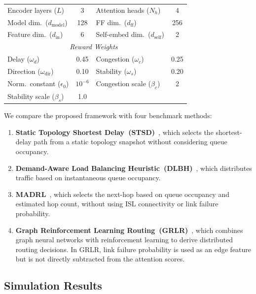 \begin{table}[t]
{\begin{tabular}{lc|lc}
\midrule
Encoder layers ($L$)                  & 3         & Attention heads ($N_h$)             & 4              \\
Model dim.\ ($d_{\mathrm{model}}$)   & 128       & FF dim.\ ($d_{\mathrm{ff}}$)       & 256            \\
Feature dim.\ ($d_{\mathrm{in}}$)    & 6         & Self-embed dim.\ ($d_{\mathrm{self}}$) & 2           \\
\midrule
\multicolumn{4}{c}{\textit{Reward Weights~\cite{chen2025distributed}}} \\
\midrule
Delay ($\omega_d$) & 0.45 & Congestion ($\omega_c$) & 0.25 \\
Direction ($\omega_{\mathrm{dir}}$) & 0.10 & Stability ($\omega_s$) & 0.20 \\
Norm.\ constant ($\epsilon_0$) & $10^{-6}$ & Congestion scale ($\beta_c$) & 2 \\
Stability scale ($\beta_s$) & 1.0 & & \\
\bottomrule
\end{tabular}%
}
\end{table}

We compare the proposed framework with four benchmark methods:
\begin{enumerate}
\item \textbf{Static Topology Shortest Delay~(STSD)}~\cite{zhang2020routing}, which selects the shortest-delay path from a static topology snapshot without considering queue occupancy.
\item \textbf{Demand-Aware Load Balancing Heuristic~(DLBH)}~\cite{bhattacharjee2024demand}, which distributes traffic based on instantaneous queue occupancy.
\item \textbf{MADRL}~\cite{liu2024enabling, lozano2025continual}, which selects the next-hop based on queue occupancy and estimated hop count, without using ISL connectivity or link failure probability.
\item \textbf{Graph Reinforcement Learning Routing~(GRLR)}~\cite{zhang2025grlr}, which combines graph neural networks with reinforcement learning to derive distributed routing decisions. In GRLR, link failure probability is used as an edge feature but is not directly subtracted from the attention scores.
\end{enumerate}

\subsection{Simulation Results}
\label{sec:results}

